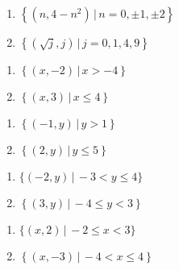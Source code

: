 \begin{multicols}{2}
\begin{enumerate}
\setcounter{enumi}{\value{HW}}

\item  $\left\{ \left(n, 4 - n^2\right) \, | \, n = 0, \pm 1, \pm 2 \right\}$
\item  $\left\{ \left(\sqrt{j}, j \right) \, | \, j = 0, 1, 4, 9 \right\}$

\setcounter{HW}{\value{enumi}}
\end{enumerate}
\end{multicols}


\begin{multicols}{2}
\begin{enumerate}
\setcounter{enumi}{\value{HW}}

\item  $\left\{ \left(x, -2 \right) \, | \, x > -4 \right\}$
\item  $\left\{ \left(x, 3 \right) \, | \, x \leq 4 \right\}$

\setcounter{HW}{\value{enumi}}
\end{enumerate}
\end{multicols}

\begin{multicols}{2}
\begin{enumerate}
\setcounter{enumi}{\value{HW}}

\item  $\left\{ \left(-1, y \right) \, | \, y > 1 \right\}$
\item  $\left\{ \left(2, y \right) \, | \, y \leq 5 \right\}$

\setcounter{HW}{\value{enumi}}
\end{enumerate}
\end{multicols}

\begin{multicols}{2}
\begin{enumerate}
\setcounter{enumi}{\value{HW}}

\item $\{ (-2, y) \, | \, -3 < y \leq 4\}$
\item  $\left\{ \left(3,y \right) \, | \, -4 \leq y < 3 \right\}$

\setcounter{HW}{\value{enumi}}
\end{enumerate}
\end{multicols}

\begin{multicols}{2}
\begin{enumerate}
\setcounter{enumi}{\value{HW}}

\item $\{ (x, 2) \, | \, -2 \leq x < 3 \}$
\item  $\left\{ \left(x,-3 \right) \, | \, -4 < x \leq 4 \right\}$

\setcounter{HW}{\value{enumi}}
\end{enumerate}
\end{multicols}


